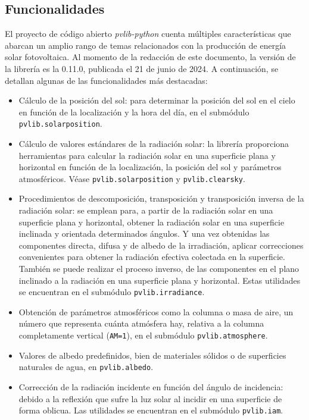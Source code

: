 \subsection{Funcionalidades} \label{ssct:pvlib:funcionalidades}

El proyecto de código abierto \textit{pvlib-python} cuenta múltiples características que abarcan un amplio rango de temas relacionados con la producción de energía solar fotovoltaica. Al momento de la redacción de este documento, la versión de la librería es la 0.11.0, publicada el 21 de junio de 2024. A continuación, se detallan algunas de las funcionalidades más destacadas:

\begin{itemize}
      \item Cálculo de la posición del sol: para determinar la posición del sol en el cielo en función de la localización y la hora del día, en el submódulo \lstinline{pvlib.solarposition}.
      \item Cálculo de valores estándares de la radiación solar: la librería proporciona herramientas para calcular la radiación solar en una superficie plana y horizontal en función de la localización, la posición del sol y parámetros atmosféricos. Véase \lstinline{pvlib.solarposition} y \lstinline{pvlib.clearsky}.
      \item Procedimientos de descomposición, transposición y transposición inversa de la radiación solar: se emplean para, a partir de la radiación solar en una superficie plana y horizontal, obtener la radiación solar en una superficie inclinada y orientada determinados ángulos. Y una vez obtenidas las componentes directa, difusa y de albedo de la irradiación, aplicar correcciones convenientes para obtener la radiación efectiva colectada en la superficie. También se puede realizar el proceso inverso, de las componentes en el plano inclinado a la radiación en una superficie plana y horizontal. Estas utilidades se encuentran en el submódulo \lstinline{pvlib.irradiance}.
      \item Obtención de parámetros atmosféricos como la columna o masa de aire, un número que representa cuánta atmósfera hay, relativa a la columna completamente vertical (\lstinline{AM=1}), en el submódulo \lstinline{pvlib.atmosphere}.
      \item Valores de albedo predefinidos, bien de materiales sólidos o de superficies naturales de agua, en \lstinline{pvlib.albedo}.
      \item Corrección de la radiación incidente en función del ángulo de incidencia: debido a la reflexión que sufre la luz solar al incidir en una superficie de forma oblicua. Las utilidades se encuentran en el submódulo \lstinline{pvlib.iam}.

\end{itemize}
